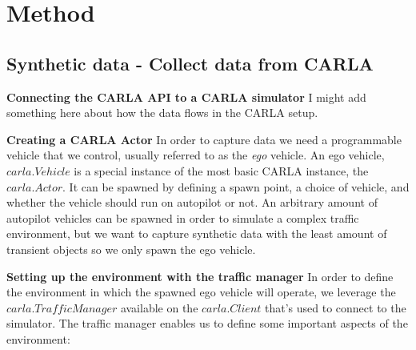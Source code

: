 \chapter{Method}

\section{Synthetic data - Collect data from CARLA}

\begin{comment}

Premise: Have no data to train a NeRF on
Question: How can we collect synthetic data from CARLA?

\begin{itemize}
    \item How can you spawn an agent, etc?
    \item How does all the basic CARLA-things work? 
    \item How to mount cameras, which sensors, location and rotation (transform).
\end{itemize}
\end{comment}

\textbf{Connecting the CARLA API to a CARLA simulator}
I might add something here about how the data flows in the CARLA setup.



\textbf{Creating a CARLA Actor}
In order to capture data we need a programmable vehicle that we control, usually referred to as the \textit{ego} vehicle. An ego vehicle, $carla.Vehicle$ is a special instance of the most basic CARLA instance, the $carla.Actor$. It can be spawned by defining a spawn point, a choice of vehicle, and whether the vehicle should run on autopilot or not. An arbitrary amount of autopilot vehicles can be spawned in order to simulate a complex traffic environment, but we want to capture synthetic data with the least amount of transient objects so we only spawn the ego vehicle.


\textbf{Setting up the environment with the traffic manager}
In order to define the environment in which the spawned ego vehicle will operate, we leverage the $carla.TrafficManager$ available on the $carla.Client$ that's used to connect to the simulator. The traffic manager enables us to define some important aspects of the environment:


